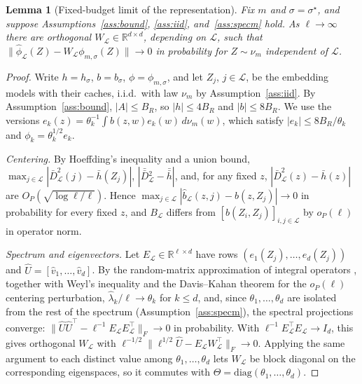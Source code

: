 \documentclass{article}
\newtheorem{lemma}{Lemma}
\theoremstyle{definition}
\theoremstyle{plain}
\begin{document}
\begin{lemma}[Fixed-budget limit of the representation]
\label{lem:nys}
Fix $m$ and $\sigma=\sigma^{\star}$, and suppose Assumptions~\ref{ass:bound},
\ref{ass:iid}, and~\ref{ass:specm} hold. As $\ell\to\infty$ there are orthogonal
$W_{\mathcal{L}}\in\mathbb{R}^{d\times d}$, depending on $\mathcal{L}$, such that
$\|\hat\phi_{\mathcal{L}}(Z)-W_{\mathcal{L}}\phi_{m,\sigma}(Z)\|\to0$ in probability for $Z\sim\nu_m$
independent of $\mathcal{L}$.
\end{lemma}
\begin{proof}
Write $h=h_\sigma$, $b=b_\sigma$, $\phi=\phi_{m,\sigma}$, and let $Z_j$, $j\in\mathcal{L}$, be
the embedding models with their caches, i.i.d.\ with law $\nu_m$ by
Assumption~\ref{ass:iid}. By Assumption~\ref{ass:bound}, $|A|\le B_R$, so
$|h|\le4B_R$ and $|b|\le8B_R$. We use the versions
$e_k(z)=\theta_k^{-1}\int b(z,w)e_k(w)\,d\nu_m(w)$, which satisfy
$|e_k|\le8B_R/\theta_k$ and $\phi_k=\theta_k^{1/2}e_k$.

\emph{Centering.} By Hoeffding's inequality and a union bound,
$\max_{j\in\mathcal{L}}|\bar D^2_{\mathcal{L}}(j)-\bar h(Z_j)|$, $|\bar{\bar D}{}^2_{\mathcal{L}}-\bar{\bar h}|$, and,
for any fixed $z$, $|\bar D^2_{\mathcal{L}}(z)-\bar h(z)|$ are $O_P(\sqrt{\log\ell/\ell})$. Hence
$\max_{j\in\mathcal{L}}|\hat b_{\mathcal{L}}(z,j)-b(z,Z_j)|\to0$ in probability for every fixed $z$, and
$B_{\mathcal{L}}$ differs from $[b(Z_i,Z_j)]_{i,j\in\mathcal{L}}$ by $o_P(\ell)$ in operator norm.

\emph{Spectrum and eigenvectors.} Let $E_{\mathcal{L}}\in\mathbb{R}^{\ell\times d}$ have rows
$(e_1(Z_j),\dots,e_d(Z_j))$ and $\hat U=[\hat v_1,\dots,\hat v_d]$. By the
random-matrix approximation of integral operators
, together with Weyl's
inequality  and the Davis--Kahan theorem  for the $o_P(\ell)$ centering perturbation,
$\hat\lambda_k/\ell\to\theta_k$ for $k\le d$, and, since
$\theta_1,\dots,\theta_d$ are isolated from the rest of the spectrum
(Assumption~\ref{ass:specm}), the spectral projections converge:
$\|\hat U\hat U^\top-\ell^{-1}E_{\mathcal{L}}E_{\mathcal{L}}^\top\|_F\to0$ in probability. With
$\ell^{-1}E_{\mathcal{L}}^\top E_{\mathcal{L}}\to I_d$, this gives orthogonal $W_{\mathcal{L}}$ with
$\ell^{-1/2}\|\ell^{1/2}\hat U-E_{\mathcal{L}}W_{\mathcal{L}}^\top\|_F\to0$. Applying the same argument to
each distinct value among $\theta_1,\dots,\theta_d$ lets $W_{\mathcal{L}}$ be block diagonal on
the corresponding eigenspaces, so it commutes with
$\Theta=\mathrm{diag}(\theta_1,\dots,\theta_d)$.


\end{proof}
\end{document}
